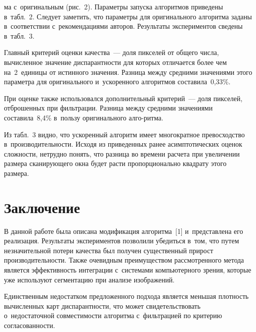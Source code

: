 \begin{multicols}{2}





\noindent
ма с~оригинальным (рис.~2). Параметры запуска алгоритмов приведены 
в~табл.~2. Следует заметить, что параметры для оригинального алгоритма 
заданы в~соответствии с~рекомендациями авторов. Результаты экспериментов 
сведены в~табл.~3.
  


  Главный критерий оценки качества~--- доля пикселей от общего числа, 
вычисленное значение диспарантности для которых отличается более чем 
на~2~единицы от истинного значения. Разница между средними значениями 
этого параметра для оригинального и~ускоренного алгоритмов 
составила~0,33\%.
  
  При оценке также использовался дополнительный критерий~--- доля 
пикселей, отброшенных при фильтрации. Разница между средними значениями 
составила~8,4\% в~пользу оригинального алго-\linebreak ритма.
  
  Из табл.~3 видно, что ускоренный алгоритм имеет многократное 
превосходство в~производительности. Исходя из приведенных ранее 
асимптотических оценок сложности, нетрудно понять, что разни\-ца во времени 
расчета при увеличении размера сканирующего окна будет расти 
пропорционально квадрату этого размера.


\section{Заключение}

  В данной работе была описана модификация алгоритма~[1] и~представлена 
его реализация. Результаты экспериментов позволили убедиться в~том, что 
путем незначительной потери качества был получен существенный прирост 
производительности. Также очевидным преимуществом рассмотренного метода 
является эффективность интеграции с~сис\-те\-ма\-ми компьютерного зрения, 
которые уже используют сегментацию при анализе изображений.
  
  Единственным недостатком предложенного подхода является меньшая 
плотность вычисленных карт диспарантности, что может свидетельствовать 
о~недостаточной совместимости алгоритма с~фильт\-ра\-ци\-ей по критерию 
согласованности.

\vspace*{-6pt}
  

\end{multicols}
